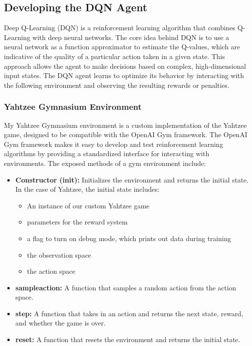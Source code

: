 \documentclass[12pt]{article}
\begin{document}
\subsection{Developing the DQN Agent}
Deep Q-Learning (DQN) is a reinforcement learning algorithm that combines Q-Learning with deep neural networks. The core idea behind DQN is to use a neural network as a function approximator to estimate the Q-values, which are indicative of the quality of a particular action taken in a given state. This approach allows the agent to make decisions based on complex, high-dimensional input states. The DQN agent learns to optimize its behavior by interacting with the following environment and observing the resulting rewards or penalties.

\subsubsection{Yahtzee Gymnasium Environment}
My Yahtzee Gymnasium environment is a custom implementation of the Yahtzee game, designed to be compatible with the OpenAI Gym framework. The OpenAI Gym framework makes it easy to develop and test reinforcement learning algorithms by providing a standardized interface for interacting with environments. The exposed methods of a gym environment include:

\begin{itemize}
    \item \textbf{Constructor (init):} Initializes the environment and returns the initial state. In the case of Yahtzee, the initial state includes:
    \begin{itemize}
        \item An instance of our custom Yahtzee game
        \item parameters for the reward system
        \item a flag to turn on debug mode, which prints out data during training
        \item the observation space
        \item the action space
    \end{itemize}
    \item \textbf{sample\textunderscore action:} A function that samples a random action from the action space.
    \item \textbf{step:} A function that takes in an action and returns the next state, reward, and whether the game is over.
    \item \textbf{reset:} A function that resets the environment and returns the initial state.
\end{itemize}
\end{document}
